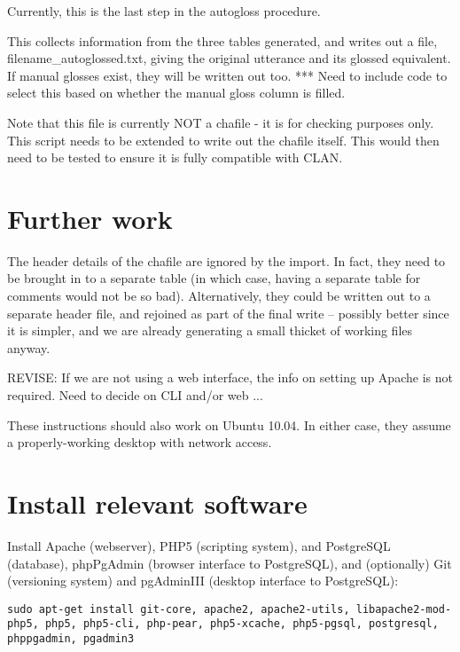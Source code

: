 \documentclass[a4paper,10pt]{article}
\begin{document}
Currently, this is the last step in the autogloss procedure.  

This collects information from the three tables generated, and writes out a file, filename\_autoglossed.txt, giving the original utterance and its glossed equivalent.  If manual glosses exist, they will be written out too.
*** Need to include code to select this based on whether the manual gloss column is filled.

Note that this file is currently NOT a chafile - it is for checking purposes only.  This script needs to be extended to write out the chafile itself.  This would then need to be tested to ensure it is fully compatible with CLAN.


\section{Further work}
\label{sec:further}

The header details of the chafile are ignored by the import.  In fact, they need to be brought in to a separate table (in which case, having a separate table for comments would not be so bad).  Alternatively, they could be written out to a separate header file, and rejoined as part of the final write -- possibly better since it is simpler, and we are already generating a small thicket of working files anyway.





\newpage
\appendix
\renewcommand{\appendixpagename}{Appendix:\\
Configuring Ubuntu 9.10}
\appendixpage

REVISE: If we are not using a web interface, the info on setting up Apache is not required.  Need to decide on CLI and/or web ...

These instructions should also work on Ubuntu 10.04. In either case, they assume a properly-working desktop with network access.

\section{Install relevant software}

Install Apache (webserver), PHP5 (scripting system), and PostgreSQL (database), phpPgAdmin (browser interface to PostgreSQL), and (optionally) Git (versioning system) and pgAdminIII (desktop interface to PostgreSQL):

\texttt{sudo apt-get install git-core, apache2, apache2-utils, libapache2-mod-php5, php5, php5-cli, php-pear, php5-xcache, php5-pgsql, postgresql, phppgadmin, pgadmin3}
\end{document}
